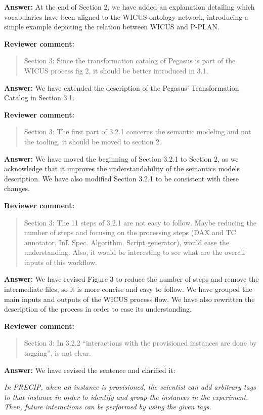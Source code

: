 \documentclass{letter}
\newenvironment{review}%
{\textbf{Reviewer comment:}\begin{quote}}%
{\end{quote}}%
\newcommand{\answer}[1]{%
      \textbf{Answer:} #1}
\newcommand{\revised}[1]{\emph{#1}\color{black}}
\begin{document}
\begin{letter}{}
\answer{At the end of Section 2, we have added an explanation detailing which vocabularies have been aligned to the WICUS ontology network, introducing a simple example depicting the relation between WICUS and P-PLAN.}


\begin{review}
Section 3: Since the transformation catalog of Pegasus is part of the WICUS process fig 2, it should be better introduced in 3.1.
\end{review}

\answer{We have extended the description of the Pegasus' Transformation Catalog in Section 3.1.}


\begin{review}
Section 3: The first part of 3.2.1 concerns the semantic modeling and not the tooling, it should be moved to section 2.
\end{review}

\answer{We have moved the beginning of Section 3.2.1 to Section 2, as we acknowledge that it improves the understandability of the semantics models description. We have also modified Section 3.2.1 to be consistent with these changes.}


\begin{review}
Section 3: The 11 steps of 3.2.1 are not easy to follow. Maybe reducing the number of steps and focusing on the processing steps (DAX and TC annotator, Inf. Spec. Algorithm, Script generator), would ease the understanding. Also, it would be interesting to see what are the overall inputs of this workflow.
\end{review}

\answer{We have revised Figure 3 to reduce the number of steps and remove the intermediate files, so it is more concise and easy to follow. We have grouped the main inputs and outputs of the WICUS process flow. We have also rewritten the description of the process in order to ease its understanding.}


\begin{review}
Section 3: In 3.2.2 ``interactions with the provisioned instances are done by tagging'', is not clear.
\end{review}

\answer{We have revised the sentence and clarified it:}

\revised{In PRECIP, when an instance is provisioned, the scientist can add arbitrary tags to that instance in order to identify and group the instances in the experiment. Then, future interactions can be performed by using the given tags.}



\end{letter}
\end{document}
